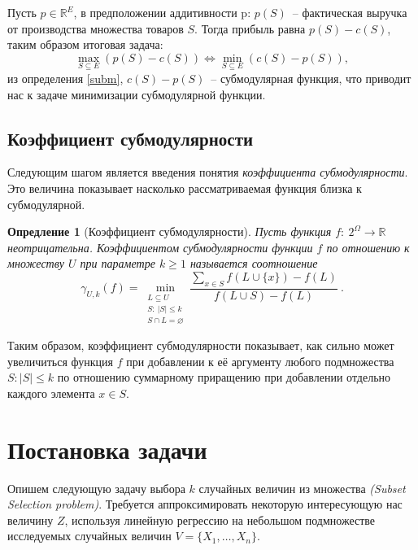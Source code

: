 \documentclass[preprint,12pt]{elsarticle}
\newtheorem{definition}{Опредление}
\newtheorem{theorem}{Теорема}
\begin{document}
Пусть $p\in \mathbb{R}^E$, в предположении аддитивности p: $p(S)$~-- фактическая выручка от производства множества товаров $S$. Тогда прибыль равна $p(S) - c(S)$, таким образом итоговая задача:
\[
\max\limits_{S \subseteq E} (p(S) - c(S)) \Leftrightarrow \min\limits_{S \subseteq E} (c(S) - p(S)),
\]
из определения \ref{subm}, $c(S) - p(S)$~-- субмодулярная функция, что приводит нас к задаче минимизации субмодулярной функции. 


\subsection{Коэффициент субмодулярности}

Следующим шагом является введения понятия \textit{коэффициента субмодулярности}. Это величина показывает насколько рассматриваемая функция близка к субмодулярной.  

\begin{definition}[Коэффициент субмодулярности]

Пусть функция $f:~2^\Omega \rightarrow \mathbb{R}$ неотрицательна. Коэффициентом субмодулярности функции $f$ по отношению к множеству $U$ при параметре $k \geqslant 1$ называется соотношение
\[\gamma_{U, k}(f)=\min\limits_{\substack{L\subseteq U \\ 
                                          S:~|S| \leqslant k \\ 
                                          S \cap L=\varnothing}} \frac{\sum\limits_{x \in S} f(L \cup\{x\})-f(L)}{f(L \cup S)-f(L)}~.\]
\end{definition}

Таким образом, коэффициент субмодулярности показывает, как сильно может увеличиться функция $f$ при добавлении к её аргументу любого подмножества $S: |S|\leqslant k$ по отношению суммарному приращению при добавлении отдельно каждого элемента $x \in S$.

\section{Постановка задачи}

\label{S:2}
Опишем следующую задачу выбора $k$ случайных величин из множества \textit{(Subset Selection problem)}. Требуется аппроксимировать некоторую интересующую нас величину $Z$, используя линейную регрессию на небольшом подмножестве исследуемых случайных величин $V=\{X_1,\dots, X_n\}$.\\
\end{document}
